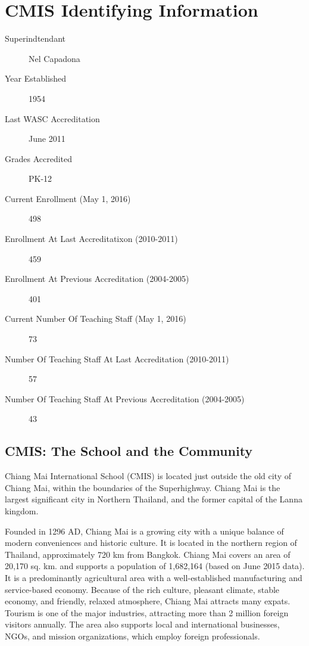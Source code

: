 \section{CMIS Identifying Information}
\begin{description}
\item[Superindtendant]
Nel Capadona
\item[Year Established]
1954
\item[Last WASC Accreditation]June 2011
\item[Grades Accredited]PK-12
\item[Current Enrollment (May 1, 2016)] 498
\item[Enrollment At Last Accreditatixon (2010-2011)] 459
\item[Enrollment At Previous Accreditation (2004-2005)]401
\item[Current Number Of Teaching Staff (May 1, 2016)]73
\item[Number Of Teaching Staff At Last Accreditation (2010-2011)]57
\item[Number Of Teaching Staff At Previous Accreditation (2004-2005)]43
\end{description}


\subsection{CMIS: The School and the Community}


Chiang Mai International School (CMIS) is located just outside the old city of Chiang Mai, within the boundaries of the Superhighway. Chiang Mai is the largest significant city in Northern Thailand, and the former capital of the Lanna kingdom.  

Founded in 1296 AD, Chiang Mai is a growing city with a unique balance of modern conveniences and historic culture.  It is located in the northern region of Thailand, approximately 720 km from Bangkok.  Chiang Mai covers an area of 20,170 sq. km. and supports a population of 1,682,164 (based on June 2015 data).  It is a predominantly agricultural area with a well-established manufacturing and service-based economy.  Because of the rich culture, pleasant climate, stable economy, and friendly, relaxed atmosphere, Chiang Mai attracts many expats.  Tourism is one of the major industries, attracting more than 2 million foreign visitors annually.  The area also supports local and international businesses, NGOs, and mission organizations, which employ foreign professionals.

